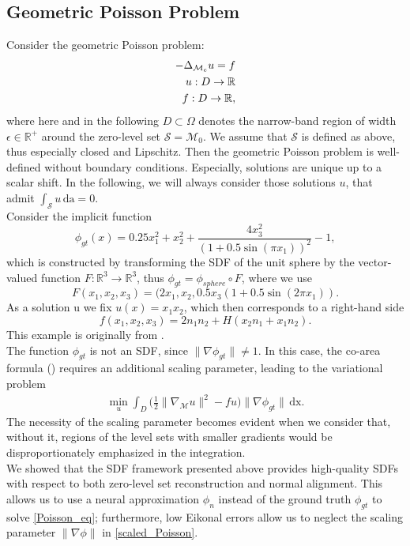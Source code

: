 \documentclass[draft,12pt,openany]{book}
\newcommand{\R}{\mathbb{R}}
\def\S{\mathcal{S}}
\theoremstyle{plainnormal}
\theoremstyle{remark}
\begin{document}
\subsection{Geometric Poisson Problem}\label{section_PoissonPB}
Consider the geometric Poisson problem: \begin{align}\label{Poisson_eq}
    -\Delta_{\mathcal{M}_c} u = f\\
    u: D \rightarrow \R \notag\\
    f: D \rightarrow\R, \notag
\end{align} 
where here and in the following $ D\subset \Omega$ denotes the narrow-band region of width $\epsilon \in\R^+$ around the zero-level set $\S =\mathcal{M}_{ 0}$. We assume that $\mathcal S$ is defined as above, thus especially closed and Lipschitz. Then the geometric Poisson problem is well-defined without boundary conditions. Especially, solutions are unique up to a scalar shift. In the following, we will always consider those solutions $u$, that admit $\int_\S u\, \mathrm{da} = 0$. 
\\
Consider the implicit function 
$$\phi_{gt}(x) = 0.25x_1^2 + x_2^2 + \frac{4x_3^2}{(1+0.5\sin(\pi x_1))^2} - 1,$$
which is constructed by transforming the SDF of the unit sphere by the vector-valued function $F: \R^3 \rightarrow \R^3$, thus $\phi_{gt} = \phi_{sphere} \circ F$, where we use $$F(x_1, x_2,x_3) = (2x_1, x_2, 0.5x_3(1+0.5\sin(2\pi x_1)).$$
As a solution u we fix $u(x) = x_1x_2$, which then corresponds to a right-hand side $$f(x_1, x_2, x_3) = 2n_1n_2 + H(x_2n_1 + x_1n_2).$$ This example is originally from \cite{Dziuk_Elliott_2013}.\\
The function $\phi_{gt}$ is not an SDF, since $\|\nabla\phi_{gt}\| \neq 1$. In this case, the co-area formula () requires an additional scaling parameter, leading to the variational problem 
\begin{align}
    \min_u\int_D \Big(\frac{1}{2}\|\nabla_\mathcal{M}u\|^2 - fu\Big) \|\nabla \phi_{gt}\| \,\mathrm{dx}.\label{scaled_Poisson}
\end{align}
The necessity of the scaling parameter becomes evident when we consider that, without it, regions of the level sets with smaller gradients would be disproportionately emphasized in the integration.\\
We showed that the SDF framework presented above provides high-quality SDFs with respect to both zero-level set reconstruction and normal alignment. This allows us to use a neural approximation $\phi_n$ instead of the ground truth $\phi_{gt}$ to solve \cref{Poisson_eq}; furthermore, low Eikonal errors allow us to neglect the scaling parameter $\|\nabla \phi\|$ in \cref{scaled_Poisson}. \\
\end{document}
